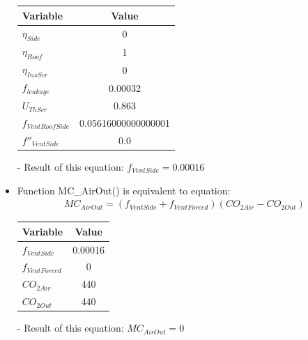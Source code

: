 \documentclass[a4paper]{article}
\begin{document}
\begin{itemize}
        \begin{table}[H]
          \centering
          \begin{tabular}{@{}lS[table-format=1.17]@{}}
            \toprule
            \textbf{Variable}    & \textbf{Value}      \\
            \midrule
            \(\eta_{Side}\)      & 0                   \\
            \(\eta_{Roof}\)      & 1                   \\
            \(\eta_{InsScr}\)    & 0                   \\
            \(f_{leakage}\)      & 0.00032             \\
            \(U_{ThScr}\)        & 0.863               \\
            \(f_{VentRoofSide}\) & 0.05616000000000001 \\
            \(f''_{VentSide}\)   & 0.0                 \\
            \bottomrule
          \end{tabular}
        \end{table}

  \item[-] Result of this equation: \(f_{VentSide} = 0.00016\)

  \item Function MC\_AirOut() is equivalent to equation:
        \begin{align*}
          MC_{AirOut} = (f_{VentSide} + f_{VentForced})(CO_{2 Air} - CO_{2 Out})
        \end{align*}

        \begin{table}[H]
          \centering
          \begin{tabular}{@{}lS@{}}
            \toprule
            \textbf{Variable}  & \textbf{Value} \\
            \midrule
            \(f_{VentSide}\)   & 0.00016        \\
            \(f_{VentForced}\) & 0              \\
            \(CO_{2 Air}\)     & 440            \\
            \(CO_{2 Out}\)     & 440            \\
            \bottomrule
          \end{tabular}
        \end{table}

  \item[-] Result of this equation: \( MC_{AirOut} = 0 \)


\end{itemize}
\end{document}
